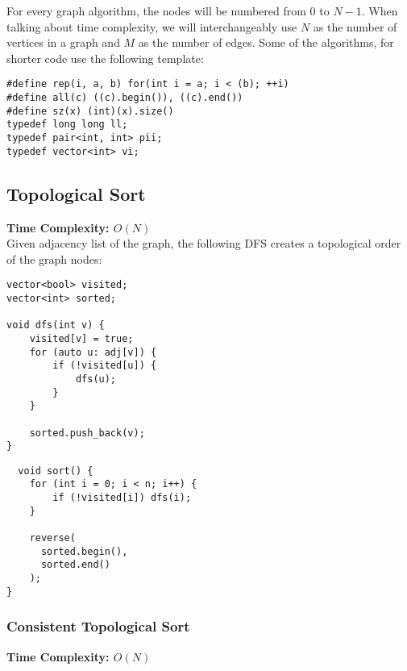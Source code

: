 For every graph algorithm, the nodes will be numbered from $0$ to $N-1$. \newline
When talking about time complexity, we will interchangeably use $N$ as the number of vertices
in a graph and $M$ as the number of edges.
Some of the algorithms, for shorter code use the following template:

\begin{lstlisting}
#define rep(i, a, b) for(int i = a; i < (b); ++i)
#define all(c) ((c).begin()), ((c).end())
#define sz(x) (int)(x).size()
typedef long long ll;
typedef pair<int, int> pii;
typedef vector<int> vi;
\end{lstlisting}

\subsection{Topological Sort}

\textbf{Time Complexity: $O(N)$}
\\

Given adjacency list of the graph, the following DFS creates a topological order of the graph nodes:

\begin{center}
\begin{minipage}[t]{0.45\linewidth}
\begin{lstlisting}
vector<bool> visited;
vector<int> sorted;

void dfs(int v) {
    visited[v] = true;
    for (auto u: adj[v]) {
        if (!visited[u]) {
            dfs(u);
        }
    }

    sorted.push_back(v);
}
\end{lstlisting}
\end{minipage}
\qquad
\begin{minipage}[t]{0.45\linewidth}
\begin{lstlisting}
  void sort() {
    for (int i = 0; i < n; i++) {
        if (!visited[i]) dfs(i);
    }

    reverse(
      sorted.begin(),
      sorted.end()
    );
}
\end{lstlisting}
\end{minipage}
\end{center}

\newpage
\subsubsection{Consistent Topological Sort}

\textbf{Time Complexity: $O(N)$}
\\

